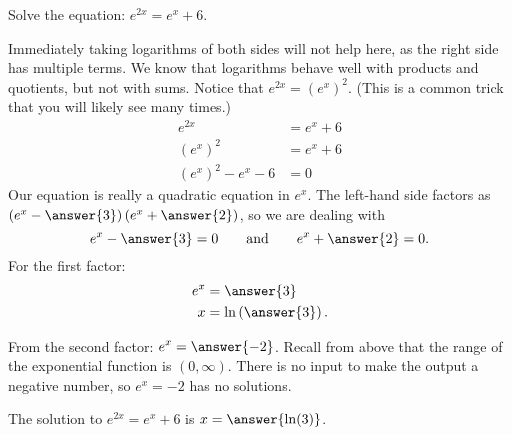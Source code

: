 \documentclass{ximera}
\begin{document}
\begin{example}
	Solve the equation: $\displaystyle e^{2x} = e^x + 6$. 
	\begin{explanation}
		Immediately taking logarithms of both sides will not help here, as the right side has multiple terms.  We know that logarithms
		behave well with products and quotients, but not with sums. 
		Notice that $e^{2x} = \left(e^x\right)^2$. (This is a common trick that you will likely see many times.)  
		\begin{align*}
			e^{2x} &= e^x + 6\\
			\left(e^x\right)^2 &= e^x + 6\\
			\left(e^x\right)^2 - e^x - 6 &= 0
		\end{align*}
		Our equation is really a quadratic equation in $e^x$.  
		The left-hand side factors as $\left( e^x - \answer{3}\right) \left(e^x + \answer{2}\right)$, so we are dealing
		with \[ e^x - \answer{3} = 0  \qquad  \textrm{and} \qquad e^x+\answer{2} = 0.\]
		For the first factor:
		\begin{align*}
			e^x &= \answer{3}\\
			x &= \ln\left( \answer{3}\right).
		\end{align*}
		
		From the second factor: $\displaystyle e^x = \answer{-2}$.  Recall from above that the range of the exponential function is $(0, \infty)$. 
		There is no input to make the output a negative
		number, so $e^x = -2$ has no solutions. 
		
		The solution to $\displaystyle e^{2x} = e^x + 6$ is $x = \answer{\ln(3)}$.
	\end{explanation}
\end{example}
\end{document}
